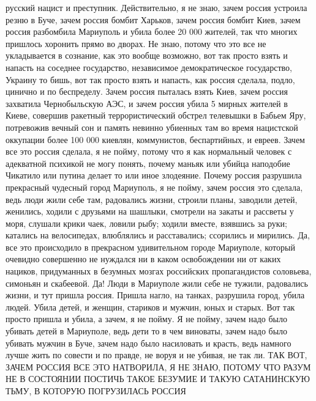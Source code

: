 русский нацист и преступник. Действительно, я не знаю, зачем
россия устроила резню в Буче, зачем россия бомбит Харьков, зачем россия бомбит
Киев, зачем россия разбомбила Мариуполь и убила более 20 000 жителей, так что
многих пришлось хоронить прямо во дворах. Не знаю, потому что это все не
укладывается в сознание, как это вообще возможно, вот так просто взять и
напасть на соседнее государство, независимое демократическое государство,
Украину то бишь, вот так просто взять и напасть, как россия сделала, подло,
цинично и по беспределу.  Зачем россия пыталась взять Киев, зачем россия
захватила Чернобыльскую АЭС, и зачем россия убила 5 мирных жителей в Киеве,
совершив ракетный террористический обстрел телевышки в Бабьем Яру, потревожив
вечный сон и память невинно убиенных там во время нацистской оккупации более
100 000 киевлян, коммунистов, беспартийных, и евреев. Зачем все это россия
сделала, я не пойму, потому что я как нормальный человек с адекватной психикой
не могу понять, почему маньяк или убийца наподобие Чикатило или путина делает
то или иное злодеяние.  Почему россия разрушила прекрасный чудесный город
Мариуполь, я не пойму, зачем россия это сделала, ведь люди жили себе там,
радовались жизни, строили планы, заводили детей, женились, ходили с друзьями на
шашлыки, смотрели на закаты и рассветы у моря, слушали крики чаек, ловили рыбу;
ходили вместе, взявшись за руки; катались на велосипедах, влюблялись и
расставались; ссорились и мирились. Да, все это происходило в прекрасном
удивительном городе Мариуполе, который очевидно совершенно не нуждался ни в
каком освобождении ни от каких нациков, придуманных в безумных мозгах
российских пропагандистов соловьева, симоньян и скабеевой. Да! Люди в Мариуполе
жили себе не тужили, радовались жизни, и тут пришла россия. Пришла нагло, на
танках, разрушила город, убила людей. Убила детей, и женщин, стариков и мужчин,
юных и старых. Вот так просто пришла и убила, а зачем, я не пойму. Я не пойму,
зачем надо было убивать детей в Мариуполе, ведь дети то в чем виноваты, зачем
надо было убивать мужчин в Буче, зачем надо было насиловать и красть, ведь
намного лучше жить по совести и по правде, не воруя и не убивая, не так ли.
ТАК ВОТ, ЗАЧЕМ РОССИЯ ВСЕ ЭТО НАТВОРИЛА, Я НЕ ЗНАЮ, ПОТОМУ ЧТО РАЗУМ НЕ В
СОСТОЯНИИ ПОСТИЧЬ ТАКОЕ БЕЗУМИЕ И ТАКУЮ САТАНИНСКУЮ ТЬМУ, В КОТОРУЮ ПОГРУЗИЛАСЬ
РОССИЯ

